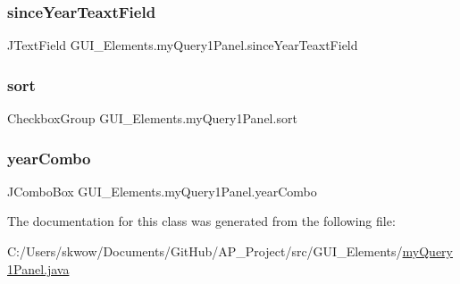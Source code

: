 \subsubsection{\texorpdfstring{since\+Year\+Teaxt\+Field}{sinceYearTeaxtField}}
{\footnotesize\ttfamily J\+Text\+Field G\+U\+I\+\_\+\+Elements.\+my\+Query1\+Panel.\+since\+Year\+Teaxt\+Field\hspace{0.3cm}{\ttfamily [protected]}}

\hypertarget{class_g_u_i___elements_1_1my_query1_panel_a349792b04363355dc174bfbad3ac6422}{}\label{class_g_u_i___elements_1_1my_query1_panel_a349792b04363355dc174bfbad3ac6422} 
\subsubsection{\texorpdfstring{sort}{sort}}
{\footnotesize\ttfamily Checkbox\+Group G\+U\+I\+\_\+\+Elements.\+my\+Query1\+Panel.\+sort\hspace{0.3cm}{\ttfamily [protected]}}

\hypertarget{class_g_u_i___elements_1_1my_query1_panel_a8327a7218462c60f0b0b9eeed6ba392c}{}\label{class_g_u_i___elements_1_1my_query1_panel_a8327a7218462c60f0b0b9eeed6ba392c} 
\subsubsection{\texorpdfstring{year\+Combo}{yearCombo}}
{\footnotesize\ttfamily J\+Combo\+Box G\+U\+I\+\_\+\+Elements.\+my\+Query1\+Panel.\+year\+Combo\hspace{0.3cm}{\ttfamily [protected]}}



The documentation for this class was generated from the following file\+:\begin{DoxyCompactItemize}
\item 
C\+:/\+Users/skwow/\+Documents/\+Git\+Hub/\+A\+P\+\_\+\+Project/src/\+G\+U\+I\+\_\+\+Elements/\hyperlink{my_query1_panel_8java}{my\+Query1\+Panel.\+java}\end{DoxyCompactItemize}
